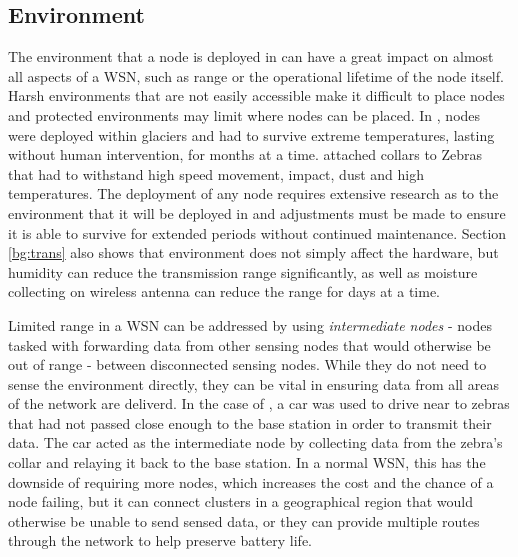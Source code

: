 \subsection{Environment}
	The environment that a node is deployed in can have a great impact on almost all aspects of a WSN, such as range or the operational lifetime of the node itself. Harsh environments that are not easily accessible make it difficult to place nodes and protected environments may limit where nodes can be placed. 
	In \cite{Martinez2004}, nodes were deployed within glaciers and had to survive extreme temperatures, lasting without human intervention, for months at a time. \cite{Martonosi2003} attached collars to Zebras that had to withstand high speed movement, impact, dust and high temperatures. The deployment of any node requires extensive research as to the environment that it will be deployed in and adjustments must be made to ensure it is able to survive for extended periods without continued maintenance.
	Section \ref{bg:trans} also shows that environment does not simply affect the hardware, but humidity can reduce the transmission range significantly, as well as moisture collecting on wireless antenna can reduce the range for days at a time.

	Limited range in a WSN can be addressed by using \textit{intermediate nodes} - nodes tasked with forwarding data from other sensing nodes that would otherwise be out of range - between disconnected sensing nodes. While they do not need to sense the environment directly, they can be vital in ensuring data from all areas of the network are deliverd. In the case of \cite{Martonosi2003}, a car was used to drive near to zebras that had not passed close enough to the base station in order to transmit their data. The car acted as the intermediate node by collecting data from the zebra's collar and relaying it back to the base station. In a normal WSN, this has the downside of requiring more nodes, which increases the cost and the chance of a node failing, but it can connect clusters in a geographical region that would otherwise be unable to send sensed data, or they can provide multiple routes through the network to help preserve battery life.

